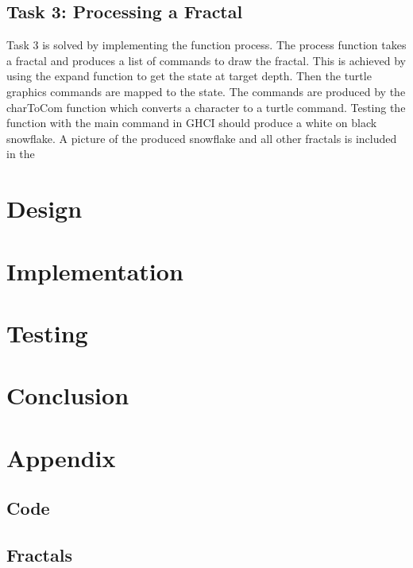 \documentclass{article}
\begin{document}
\subsection{Task 3: Processing a Fractal}
Task 3 is solved by implementing the function process. The process function takes a fractal and produces a list of commands to draw the fractal. This is achieved by using the expand function to get the state at target depth. Then the turtle graphics commands are mapped to the state. The commands are produced by the charToCom function which converts a character to a turtle command. Testing the function with the main command in GHCI should produce a white on black snowflake. A picture of the produced snowflake and all other fractals is included in the 

\section{Design}

\section{Implementation}

\section{Testing}

\section{Conclusion}

\section{Appendix}

\subsection{Code}

\subsection{Fractals}
\end{document}
